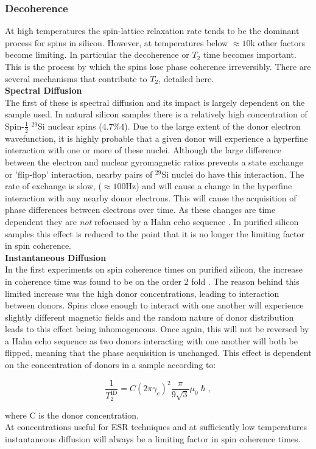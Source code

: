 \subsubsection{Decoherence}

At high temperatures the spin-lattice relaxation rate tends to be the dominant process for spins in silicon.
However, at temperatures below $\approx 10$k other factors become limiting. 
In particular the decoherence or $T_2$ time becomes important. 
This is the process by which the spins lose phase coherence irreversibly. 
There are several mechanisms that contribute to $T_2$, detailed here.
\\
\textbf{Spectral Diffusion}
\\
The first of these is spectral diffusion and its impact is largely dependent on the sample used.
In natural silicon samples there is a relatively high concentration of Spin-$\frac{1}{2}$ $^{29}$Si nuclear spins ($4.7\%4$). 
Due to the large extent of the donor electron wavefunction, it is highly probable that a given donor will experience a hyperfine interaction with one or more of these nuclei.
Although the large difference between the electron and nuclear gyromagnetic ratios prevents a state exchange or 'flip-flop' interaction, nearby pairs of $^{29}$Si nuclei do have this interaction.
The rate of exchange is slow, ($\approx 100$Hz) and will cause a change in the hyperfine interaction with any nearby donor electrons.
This will cause the acquisition of phase differences between electrons over time.
As these changes are time dependent they are \textit{not} refocused by a Hahn echo sequence \cite{Wolfowicz2015a}. 
In purified silicon samples this effect is reduced to the point that it is no longer the limiting factor in spin coherence.
\\
\textbf{Instantaneous Diffusion}
\\
In the first experiments on spin coherence times on purified silicon, the increase in coherence time was found to be on the order 2 fold \cite{Gordon1958}.
The reason behind this limited increase was the high donor concentrations, leading to interaction between donors.
Spins close enough to interact with one another will experience slightly different magnetic fields and the random nature of donor distribution leads to this effect being inhomogeneous.
Once again, this will not be reversed by a Hahn echo sequence as two donors interacting with one another will both be flipped, meaning that the phase acquisition is unchanged.
This effect is dependent on the concentration of donors in a sample according to:

\begin{equation}
\frac{1}{T_{2}^{\text{ID}}} = C(2\pi\gamma_e)^2\frac{\pi}{9\sqrt{3}}\mu_0\hslash,
\label{eq:instDiff}
\end{equation}

where C is the donor concentration.
\\
At concentrations useful for ESR techniques and at sufficiently low temperatures instantaneous diffusion will always be a limiting factor in spin coherence times.

